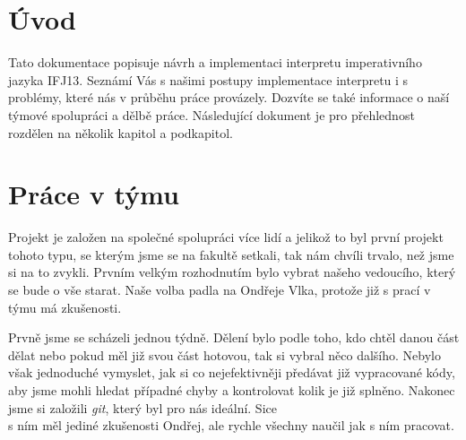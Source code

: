 \documentclass[12pt,a4paper,titlepage,final]{article}
\begin{document}

\def\author{Vlk Onřej, xvlkon00, vedoucí týmu, 20\% \\
Lukeš Petr, xlukes06, 20\% \\
Filípek Martin, xfilip32, 20\% \\
Kulda Jiří, xkulda00, 20\% \\
Jásenský Michal, xjasen00, 20\% \\}
\def\projname{Implementace interpretu imperativního jazyka IFJ13}



\pagestyle{plain}
\setcounter{page}{1}
\tableofcontents

\newpage
\pagestyle{plain}
\setcounter{page}{1}

\section{Úvod} \label{uvod}

Tato dokumentace popisuje návrh a implementaci interpretu imperativního jazyka IFJ13. Seznámí Vás s našimi postupy implementace interpretu i s problémy, které nás v průběhu práce provázely. Dozvíte se také informace o naší týmové spolupráci a dělbě práce. Následující dokument je pro přehlednost rozdělen na několik kapitol a podkapitol.

\section{Práce v týmu}

Projekt je založen na společné spolupráci více lidí a jelikož to byl první projekt tohoto typu, se kterým jsme se 
na fakultě setkali, tak nám chvíli trvalo, než jsme si na to zvykli. Prvním velkým rozhodnutím bylo vybrat našeho vedoucího, který se bude o vše starat. Naše volba padla na Ondřeje Vlka, protože již s prací v týmu má zkušenosti.

Prvně jsme se scházeli jednou týdně. Dělení bylo podle toho, kdo chtěl danou část dělat nebo pokud měl již svou část hotovou, tak si vybral něco dalšího. Nebylo však jednoduché vymyslet, jak si co nejefektivněji předávat již vypracované kódy, aby jsme mohli hledat případné chyby a kontrolovat kolik je již splněno. Nakonec jsme si založili \textit{git}, který byl pro nás ideální. Sice \\s ním měl jediné zkušenosti Ondřej, ale rychle všechny naučil jak s ním pracovat.
\end{document}
